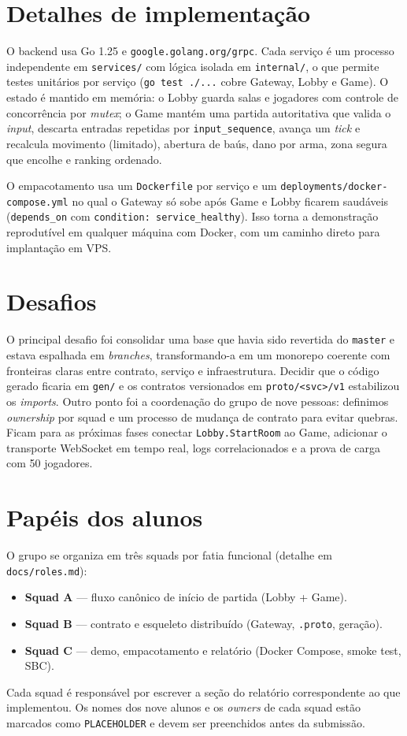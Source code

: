 \documentclass[12pt]{article}
\begin{document}
\section{Detalhes de implementação}

O backend usa Go 1.25 e \texttt{google.golang.org/grpc}. Cada serviço é um processo
independente em \texttt{services/} com lógica isolada em \texttt{internal/}, o que permite testes
unitários por serviço (\texttt{go test ./...} cobre Gateway, Lobby e Game). O estado é mantido
em memória: o Lobby guarda salas e jogadores com controle de concorrência por \textit{mutex}; o
Game mantém uma partida autoritativa que valida o \textit{input}, descarta entradas repetidas por
\texttt{input\_sequence}, avança um \textit{tick} e recalcula movimento (limitado), abertura de
baús, dano por arma, zona segura que encolhe e ranking ordenado.

O empacotamento usa um \texttt{Dockerfile} por serviço e um
\texttt{deployments/docker-compose.yml} no qual o Gateway só sobe após Game e Lobby ficarem
saudáveis (\texttt{depends\_on} com \texttt{condition: service\_healthy}). Isso torna a demonstração
reprodutível em qualquer máquina com Docker, com um caminho direto para implantação em VPS.

\section{Desafios}

O principal desafio foi consolidar uma base que havia sido revertida do \texttt{master} e
estava espalhada em \textit{branches}, transformando-a em um monorepo coerente com fronteiras
claras entre contrato, serviço e infraestrutura. Decidir que o código gerado ficaria em
\texttt{gen/} e os contratos versionados em \texttt{proto/<svc>/v1} estabilizou os \textit{imports}.
Outro ponto foi a coordenação do grupo de nove pessoas: definimos \textit{ownership} por squad e
um processo de mudança de contrato para evitar quebras. Ficam para as próximas fases conectar
\texttt{Lobby.StartRoom} ao Game, adicionar o transporte WebSocket em tempo real, logs
correlacionados e a prova de carga com 50 jogadores.

\section{Papéis dos alunos}

O grupo se organiza em três squads por fatia funcional (detalhe em \texttt{docs/roles.md}):
\begin{itemize}[noitemsep]
  \item \textbf{Squad A} --- fluxo canônico de início de partida (Lobby + Game).
  \item \textbf{Squad B} --- contrato e esqueleto distribuído (Gateway, \texttt{.proto}, geração).
  \item \textbf{Squad C} --- demo, empacotamento e relatório (Docker Compose, smoke test, SBC).
\end{itemize}
Cada squad é responsável por escrever a seção do relatório correspondente ao que implementou.
Os nomes dos nove alunos e os \textit{owners} de cada squad estão marcados como
\texttt{PLACEHOLDER} e devem ser preenchidos antes da submissão.
\end{document}
